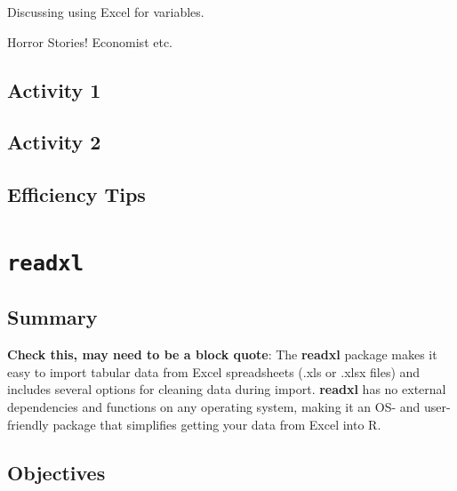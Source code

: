 \documentclass[]{book}
\begin{document}
Discussing using Excel for variables.

Horror Stories! Economist etc.

\hypertarget{activity-1}{%
\section{Activity 1}\label{activity-1}}

\hypertarget{activity-2}{%
\section{Activity 2}\label{activity-2}}

\hypertarget{efficiency-tips}{%
\section{Efficiency Tips}\label{efficiency-tips}}

\hypertarget{readxl}{%
\chapter{\texorpdfstring{\texttt{readxl}}{readxl}}\label{readxl}}

\hypertarget{summary}{%
\section{Summary}\label{summary}}

\textbf{Check this, may need to be a block quote}: The \textbf{readxl} package makes it easy to import tabular data from Excel spreadsheets (.xls or .xlsx files) and includes several options for cleaning data during import. \textbf{readxl} has no external dependencies and functions on any operating system, making it an OS- and user-friendly package that simplifies getting your data from Excel into R.

\hypertarget{objectives}{%
\section{Objectives}\label{objectives}}
\end{document}
